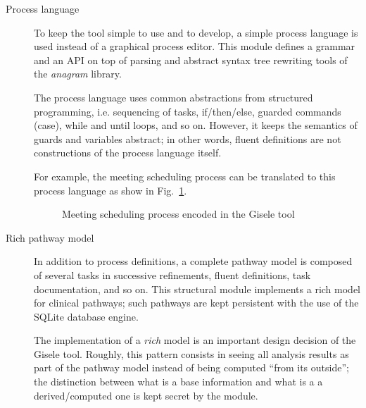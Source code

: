 \begin{description}
\item[Process language] To keep the tool simple to use and to develop, a simple process language is used instead of a graphical process editor. This module defines a grammar and an API on top of parsing and abstract syntax tree rewriting tools of the \emph{anagram} library.

The process language uses common abstractions from structured programming, i.e. sequencing of tasks, if/then/else, guarded commands (case), while and until loops, and so on. However, it keeps the semantics of guards and variables abstract; in other words, fluent definitions are not constructions of the process language itself.

For example, the meeting scheduling process can be translated to this process language as show in Fig.~\ref{image:meeting-scheduling-gis}.

\begin{figure}
\centering{}
  \caption{Meeting scheduling process encoded in the Gisele tool\label{image:meeting-scheduling-gis}}
\end{figure}

\item[Rich pathway model] In addition to process definitions, a complete pathway model is composed of several tasks in successive refinements, fluent definitions, task documentation, and so on. This structural module implements a rich model for clinical pathways; such pathways are kept persistent with the use of the SQLite database engine.

The implementation of a \emph{rich} model is an important design decision of the Gisele tool. Roughly, this pattern consists in seeing all analysis results as part of the pathway model instead of being computed ``from its outside''; the distinction between what is a base information and what is a a derived/computed one is kept secret by the module.


\end{description}
